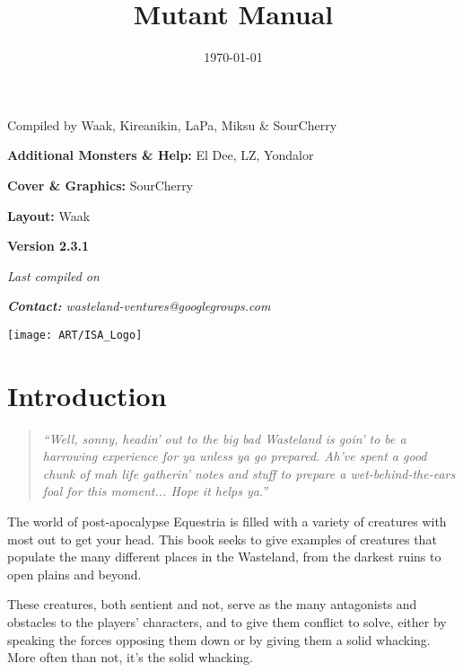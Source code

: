 \documentclass[11pt,a4paper,twocolumn]{book}
\title{Mutant Manual}
\date{\today}
\begin{document}
	
		
	\onecolumn	
	\setcounter{page}{1}
	
	\begin{center}
		Compiled by Waak, Kireanikin, LaPa, Miksu \& SourCherry
		
		\bigskip
		\textbf{Additional Monsters \& Help:} El Dee, LZ, Yondalor
		
		\bigskip
		\textbf{Cover \& Graphics:} SourCherry
		
		\bigskip
		\textbf{Layout:} Waak
		
	\end{center}
	
	\vfill
	
	\begin{center}
		\textbf{Version 2.3.1}
		
		\emph{Last compiled on \thedate}
		
		\emph{\textbf{Contact:} wasteland-ventures@googlegroups.com}
		
	\end{center}
	\begin{figure*}[bp]
		\centering
		\texttt{[image: ART/ISA\_Logo]}
		\label{fig:isalogo}
	\end{figure*}
	
	\twocolumn
	
	\tableofcontents	
	
	
	\chapter{Introduction}
	\begin{quote}
		\emph{``Well, sonny, headin' out to the big bad Wasteland is goin' to be a harrowing experience for ya unless ya go prepared. Ah've spent a good chunk of mah life gatherin' notes and stuff to prepare a wet-behind-the-ears foal for this moment... Hope it helps ya.''}
	\end{quote}
	
	The world of post-apocalypse Equestria is filled with a variety of creatures with most out to get your head. This book seeks to give examples of creatures that populate the many different places in the Wasteland, from the darkest ruins to open plains and beyond.
	
	These creatures, both sentient and not, serve as the many antagonists and obstacles to the players' characters, and to give them conflict to solve, either by speaking the forces opposing them down or by giving them a solid whacking. More often than not, it's the solid whacking.
	
\end{document}
